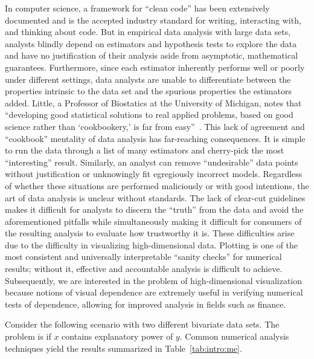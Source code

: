 In computer science, a framework for ``clean code'' has been extensively
documented and is the accepted industry standard for writing, interacting with,
and thinking about code. But in empirical data analysis with large data sets,
analysts blindly depend on estimators and hypothesis tests to explore the data
and have no justification of their analysis aside from asymptotic, mathematical
guarantees. Furthermore, since each estimator inherently performs well or poorly
under different settings, data analysts are unable to differentiate between the
properties intrinsic to the data set and the spurious properties the estimators
added. Little, a Professor of Biostatics at the University of Michigan, notes
that ``developing good statistical solutions to real applied problems, based on
good science rather than `cookbookery,' is far from easy''~\cite{little2013}.
This lack of agreement and ``cookbook'' mentality of data analysis has
far-reaching consequences. It is simple to run the data through a list of many
estimators and cherry-pick the most ``interesting'' result. Similarly, an
analyst can remove ``undesirable'' data points without justification or 
unknowingly fit egregiously incorrect models. Regardless of whether these 
situations are performed maliciously or with good intentions, the art of data 
analysis is unclear without standards. The lack of clear-cut guidelines makes 
it difficult for analysts to discern the ``truth'' from the data and avoid the 
aforementioned pitfalls while simultaneously making it difficult for consumers 
of the resulting analysis to evaluate how trustworthy it is. These difficulties 
arise due to the difficulty in visualizing high-dimensional data. Plotting is 
one of the most consistent and universally interpretable ``sanity checks'' for 
numerical results; without it, effective and accountable analysis is difficult 
to achieve. Subsequently, we are interested in the problem of high-dimensional 
visualization because notions of visual dependence are extremely useful in 
verifying numerical tests of dependence, allowing for improved analysis in 
fields such as finance.

Consider the following scenario with two different bivariate data sets. The
problem is if $x$ contains explanatory power of $y$. Common numerical analysis
techniques yield the results summarized in Table~\ref{tab:intro:me}.

\tablespacing

